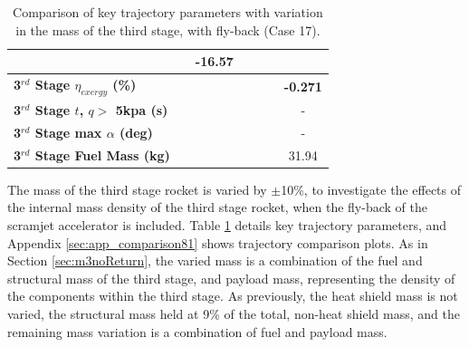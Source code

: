 \begin{table}[ht]
\begin{tabular}{l c c c c c c}
		& \returnDistmThreeOneHundredTen
		&-16.57
		\\
		\hline 
		\textbf{3$^{rd}$ Stage $\eta_{exergy}$ (\%)}
		& \textbf{\thirddExergyEffmThreeNinety}
		& \textbf{\thirddExergyEffmThreeNinetyFive}
		& \textbf{\thirddExergyEffmThreeStandard}
		& \textbf{\thirddExergyEffmThreeOneHundredFive}
		& \textbf{\thirddExergyEffmThreeOneHundredTen}
		& \textbf{-0.271}
		\\
		\textbf{3$^{rd}$ Stage $t$, $q >$ 5kpa (s)}
		& \thirdqOverFivemThreeNinety
		& \thirdqOverFivemThreeNinetyFive
		& \thirdqOverFivemThreeStandard
		& \thirdqOverFivemThreeOneHundredFive
		& \thirdqOverFivemThreeOneHundredTen
		& -
		\\
		\textbf{3$^{rd}$ Stage max $\alpha$ (deg)}
		& \thirdmaxAoAmThreeNinety
		& \thirdmaxAoAmThreeNinetyFive
		& \thirdmaxAoAmThreeStandard
		& \thirdmaxAoAmThreeOneHundredFive
		& \thirdmaxAoAmThreeOneHundredTen
		& -
		\\
		\textbf{3$^{rd}$ Stage Fuel Mass (kg)}
		& \thirdmFuelmThreeNinety
		& \thirdmFuelmThreeNinetyFive
		& \thirdmFuelmThreeStandard
		& \thirdmFuelmThreeOneHundredFive
		& \thirdmFuelmThreeOneHundredTen
		&31.94
		\\
		\hline 
	\end{tabular} 
	\caption{Comparison of key trajectory parameters with variation in the mass of the third stage, with fly-back (Case 17).}
	\label{tab:comparison81}
\end{table}

The mass of the third stage rocket is varied by $\pm$10\%, to investigate the effects of the internal mass density of the third stage rocket, when the fly-back of the scramjet accelerator is included. Table \ref{tab:comparison81} details key trajectory parameters, and Appendix \ref{sec:app_comparison81} shows trajectory comparison plots. As in Section \ref{sec:m3noReturn}, the varied mass is a combination of the fuel and structural mass of the third stage, and payload mass, representing the density of the components within the third stage. As previously, the heat shield mass is not varied, the structural mass held at 9\% of the total, non-heat shield mass, and the remaining mass variation is a combination of fuel and payload mass.

